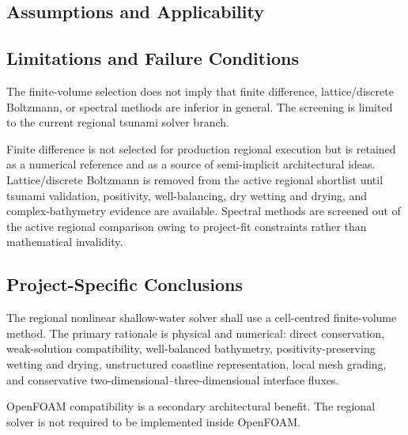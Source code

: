 \subsection{Assumptions and Applicability}
\label{sec:res-num-frm-assumptions}


\subsection{Limitations and Failure Conditions}
\label{sec:res-num-frm-limitations}


The finite-volume selection does not imply that finite difference,
lattice/discrete Boltzmann, or spectral methods are inferior in general.
The screening is limited to the current regional tsunami solver branch.

Finite difference is not selected for production regional execution but
is retained as a numerical reference and as a source of semi-implicit
architectural ideas. Lattice/discrete Boltzmann is removed from the
active regional shortlist until tsunami validation, positivity,
well-balancing, dry wetting and drying, and complex-bathymetry evidence
are available. Spectral methods are screened out of the active regional
comparison owing to project-fit constraints rather than mathematical
invalidity.

\subsection{Project-Specific Conclusions}
\label{sec:res-num-frm-conclusions}


The regional nonlinear shallow-water solver shall use a cell-centred
finite-volume method. The primary rationale is physical and numerical:
direct conservation, weak-solution compatibility, well-balanced
bathymetry, positivity-preserving wetting and drying, unstructured
coastline representation, local mesh grading, and conservative
two-dimensional--three-dimensional interface fluxes.

OpenFOAM compatibility is a secondary architectural benefit. The
regional solver is not required to be implemented inside OpenFOAM.

